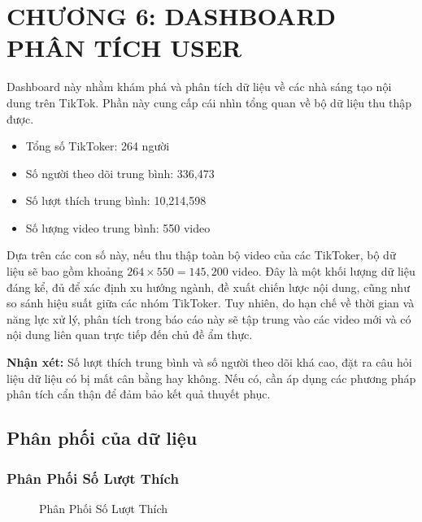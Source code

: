 \section{CHƯƠNG 6: DASHBOARD PHÂN TÍCH USER}


Dashboard này nhằm khám phá và phân tích dữ liệu về các nhà sáng tạo nội dung trên TikTok. Phần này cung cấp cái nhìn tổng quan về bộ dữ liệu thu thập được.

\begin{itemize}
    \item Tổng số TikToker: 264 người
    \item Số người theo dõi trung bình: 336,473
    \item Số lượt thích trung bình: 10,214,598
    \item Số lượng video trung bình: 550 video
\end{itemize}

Dựa trên các con số này, nếu thu thập toàn bộ video của các TikToker, bộ dữ liệu sẽ bao gồm khoảng $264 \times 550 = 145{,}200$ video. Đây là một khối lượng dữ liệu đáng kể, đủ để xác định xu hướng ngành, đề xuất chiến lược nội dung, cũng như so sánh hiệu suất giữa các nhóm TikToker. Tuy nhiên, do hạn chế về thời gian và năng lực xử lý, phân tích trong báo cáo này sẽ tập trung vào các video mới và có nội dung liên quan trực tiếp đến chủ đề ẩm thực.


\textbf{Nhận xét:} Số lượt thích trung bình và số người theo dõi khá cao, đặt ra câu hỏi liệu dữ liệu có bị mất cân bằng hay không. Nếu có, cần áp dụng các phương pháp phân tích cẩn thận để đảm bảo kết quả thuyết phục.

\subsection{Phân phối của dữ liệu}


\subsubsection{Phân Phối Số Lượt Thích}
\begin{figure}[H]
    \centering
    \caption{Phân Phối Số Lượt Thích}
    \label{fig:phan_phoi_luot_thich}
\end{figure}

